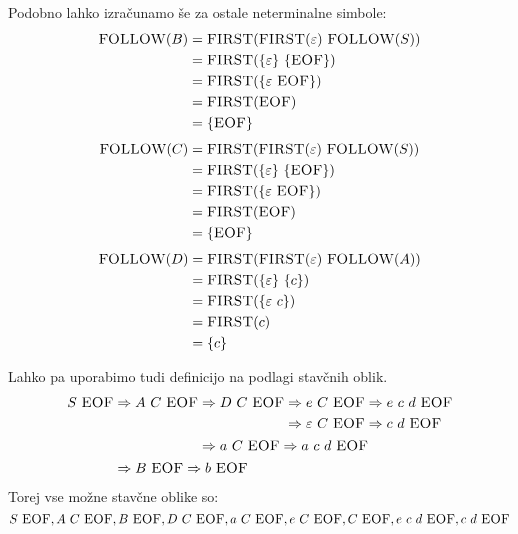 \documentclass{article}
\newcommand{\FIRST}{\textsc{FIRST}}
\newcommand{\FOLLOW}{\textsc{FOLLOW}}
\newcommand{\EOF}{\textsc{EOF}}
\newcommand{\Null}{\varepsilon}
\newcommand{\Derive}{\Rightarrow}
\newcommand{\Seq}{\ }
\begin{document}
Podobno lahko izračunamo še za ostale neterminalne simbole:
\begin{align*}
  \FOLLOW(B) &= \FIRST(\FIRST(\Null) \Seq \FOLLOW(S)) \\
             &= \FIRST(\{\Null\} \Seq \{\EOF\})\\
             &= \FIRST(\{\Null \Seq \EOF\})\\
             &= \FIRST(\EOF) \\
             &= \{\EOF\}
\end{align*}
\begin{align*}
  \FOLLOW(C) &= \FIRST(\FIRST(\Null) \Seq \FOLLOW(S)) \\
             &= \FIRST(\{\Null\} \Seq \{\EOF\})\\
             &= \FIRST(\{\Null \Seq \EOF\})\\
             &= \FIRST(\EOF) \\
             &= \{\EOF\}
\end{align*}
\begin{align*}
  \FOLLOW(D) &= \FIRST(\FIRST(\Null) \Seq \FOLLOW(A)) \\
             &= \FIRST(\{\Null\} \Seq \{c\})\\
             &= \FIRST(\{\Null \Seq c\})\\
             &= \FIRST(c) \\
             &= \{c\}
\end{align*}

Lahko pa uporabimo tudi definicijo na podlagi stavčnih oblik.
\begin{equation*}
  S \Seq \EOF \begin{aligned}[t]
    &\Derive A \Seq C \Seq \EOF \begin{aligned}[t]
      &\Derive D \Seq C \Seq \EOF \begin{aligned}[t]
        &\Derive e \Seq C \Seq \EOF \Derive e \Seq c \Seq d \Seq \EOF \\
        &\Derive \Null \Seq C \Seq \EOF \Derive c \Seq d \Seq \EOF \\
      \end{aligned}\\
      &\Derive a \Seq C \Seq \EOF \Derive a \Seq c \Seq d \Seq \EOF
    \end{aligned}\\
  &\Derive B \Seq \EOF \Derive b \Seq \EOF
  \end{aligned}
\end{equation*}
Torej vse možne stavčne oblike so:
\begin{equation*}
  S \Seq \EOF, A \Seq C \Seq \EOF, B \Seq \EOF, D \Seq C \Seq \EOF, a \Seq C \Seq \EOF, e \Seq C \Seq \EOF, C \Seq \EOF, e \Seq c \Seq d \Seq \EOF, c \Seq d \Seq \EOF
\end{equation*}
\end{document}
